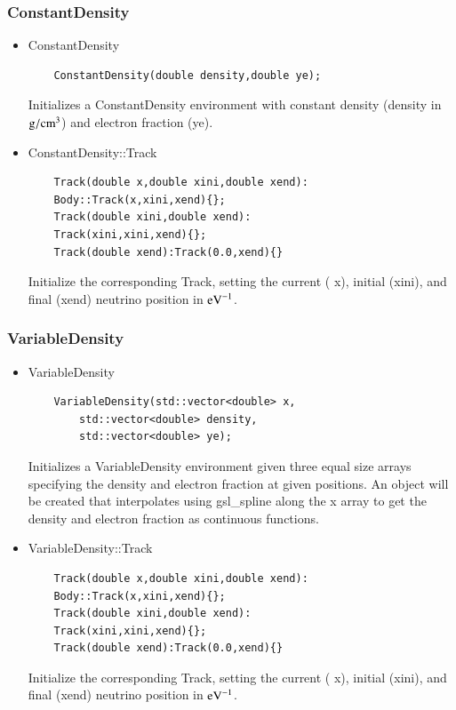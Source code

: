 \documentclass[3p,12pt]{elsarticle}
\newcommand{\ttf}{\ttfamily}
\begin{document}
\subsubsection{ConstantDensity \label{sec:constant_density}}

\begin{itemize}
\item {\ttf ConstantDensity}
  \begin{lstlisting}
    ConstantDensity(double density,double ye);
  \end{lstlisting}
  Initializes a {\ttf ConstantDensity} environment with constant
  density ({\ttf density} in ${\rm g}/{\rm cm}^3$) and electron
  fraction ({\ttf ye}).
\item {\ttf ConstantDensity::Track}
  \begin{lstlisting}
    Track(double x,double xini,double xend):
    Body::Track(x,xini,xend){};
    Track(double xini,double xend):
    Track(xini,xini,xend){};
    Track(double xend):Track(0.0,xend){}
  \end{lstlisting}
  Initialize the corresponding {\ttf Track}, setting the current ({\ttf
  x}), initial ({\ttf xini}), and final ({\ttf xend}) neutrino position in ${\rm eV}^{-1}$.
\end{itemize}

\subsubsection{VariableDensity \label{sec:variable_density}}

\begin{itemize}
\item {\ttf VariableDensity}
  \begin{lstlisting}
    VariableDensity(std::vector<double> x,
        std::vector<double> density,
        std::vector<double> ye);
  \end{lstlisting}
  Initializes a {\ttf VariableDensity} environment given three equal size arrays specifying the density and electron fraction at given positions. An object will be created that interpolates using {\ttfamily gsl\_spline} \citep{gough2009gnu} along the {\ttf x} array to get the density and electron fraction as continuous functions.
  \item {\ttf VariableDensity::Track}
  \begin{lstlisting}
    Track(double x,double xini,double xend):
    Body::Track(x,xini,xend){};
    Track(double xini,double xend):
    Track(xini,xini,xend){};
    Track(double xend):Track(0.0,xend){}
  \end{lstlisting}
  Initialize the corresponding {\ttf Track}, setting the current ({\ttf
  x}), initial ({\ttf xini}), and final ({\ttf xend}) neutrino position in ${\rm eV}^{-1}$.
\end{itemize}
\end{document}
